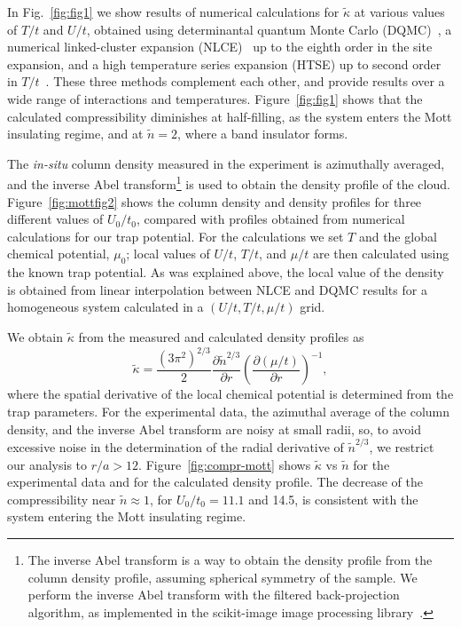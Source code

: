 \FigureOne In Fig.~\ref{fig:fig1} we show results of numerical calculations for
$\tilde{\kappa}$ at various values of $T/t$ and $U/t$, obtained using
determinantal quantum Monte Carlo (DQMC)~\cite{PhysRevD.24.2278,Paiva2010}, a
numerical linked-cluster expansion (NLCE)~\cite{Rigol2006,Tang2013} up to the
eighth order in the site expansion, and a high temperature series expansion
(HTSE) up to second order in $T/t$~\cite{Henderson1992}.  These three methods
complement each other, and provide results over a wide range of interactions
and temperatures.  Figure~\ref{fig:fig1} shows that the calculated
compressibility diminishes at half-filling, as the system enters the Mott
insulating regime, and at $\tilde{n}=2$, where a band insulator forms. 


\FigureTwo The \textit{in-situ} column density measured in the experiment is
azimuthally averaged, and the inverse Abel transform\footnote{The inverse Abel
transform is a way to obtain the density profile from the column density
profile, assuming spherical symmetry of the sample. We perform the inverse Abel
transform with the filtered back-projection algorithm, as implemented in the
{scikit-image} image processing library~\cite{scikit-image}.}  is used to
obtain the density profile of the cloud.  Figure~\ref{fig:mottfig2} shows the
column density and density profiles for three different values of
$U_{0}/t_{0}$, compared with profiles obtained from numerical calculations for
our trap potential. For the calculations we set $T$ and the global chemical
potential, $\mu_{0}$; local values of $U/t$, $T/t$, and $\mu/t$ are then
calculated using the known trap potential.  As was explained above, the local
value of the density is obtained from linear interpolation between NLCE and
DQMC results for a homogeneous system calculated in a $(U/t,T/t,\mu/t)$ grid.  
 
We obtain $\tilde{\kappa}$ from the measured and calculated density profiles as 
\begin{equation}
\tilde{\kappa} =   
             \frac{ (3\pi^{2})^{2/3} }{ 2 } 
             \frac{ \partial \tilde{n}^{2/3} }{ \partial r } 
      \left(   \frac{ \partial (\mu/t) }{ \partial r }   \right)^{-1},
\end{equation}
where the spatial derivative of the local chemical potential is determined from
the trap parameters.  For the experimental data, the azimuthal average of the
column density, and the inverse Abel transform are noisy at small radii, so, to
avoid excessive noise in the determination of the radial derivative of
$\tilde{n}^{2/3}$, we restrict our analysis to $r/a > 12$.
Figure~\ref{fig:compr-mott} shows $\tilde{\kappa}$ vs $\tilde{n}$ for the
experimental data and for the calculated density profile.  The decrease of the
compressibility near $\tilde{n}\approx 1$, for $U_{0}/t_{0}=11.1$ and 14.5, is
consistent with the system entering the Mott insulating regime. 

